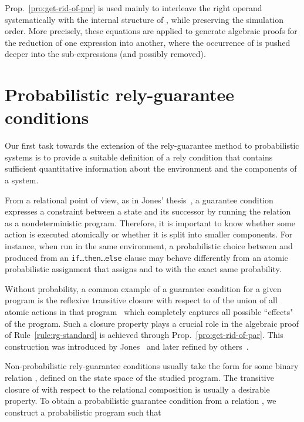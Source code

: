 \documentclass[review]{elsart}
\newcommand{\Prop}[1]{Prop.~\ref{#1}}
\begin{document}
\Prop{pro:get-rid-of-par} is used mainly to interleave the right operand  systematically with the internal structure of , while preserving the simulation order. More precisely, these equations are applied to generate algebraic proofs for the reduction of one expression into another, where the occurrence of  is pushed deeper into the sub-expressions (and possibly removed).


\section{Probabilistic rely-guarantee conditions}\label{sec:prgc}

Our first task towards the extension of the rely-guarantee method to probabilistic systems is to provide a suitable definition of a rely condition that contains sufficient quantitative information about the environment and the components of a system. 

From a relational point of view, as in Jones' thesis~\cite{Jon81}, a guarantee condition expresses a constraint between a state and its successor by running the relation as a nondeterministic program. Therefore, it is important to know whether some action is executed atomically or whether it is split into smaller components. 
For instance, when run in the same environment, a probabilistic choice between  and  produced from an \texttt{if\dots then\dots else} clause may behave differently from an atomic probabilistic assignment that assigns  and  to  with the exact same probability.



Without probability, a common example of a guarantee condition for a given program is the reflexive transitive closure with respect to  of the union of all atomic actions in that program~\cite{Hoa09a} which completely captures all possible ``effects" of the program. Such a closure property plays a crucial role in the algebraic proof of Rule~\ref{rule:rg-standard} is achieved through \Prop{pro:get-rid-of-par}. This construction was introduced by Jones~\cite{Jon81} and later refined by others~\cite{Din02,Jon12,Hoa09a}.

Non-probabilistic rely-guarantee conditions usually take the form  for some binary relation , defined on the state space of the studied program. The transitive closure of  with respect to the relational composition  is usually a desirable property. To obtain a probabilistic guarantee condition from a relation , we construct a probabilistic program   such that 
\end{document}
